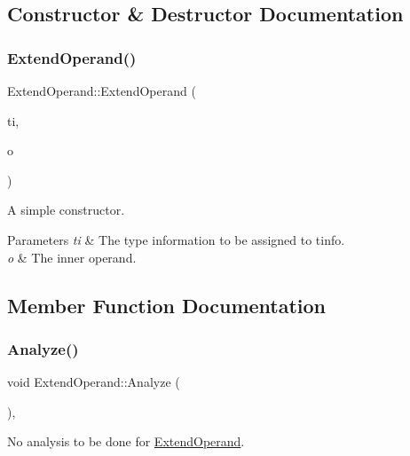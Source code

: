 \subsection{Constructor \& Destructor Documentation}
\mbox{\label{class_extend_operand_acf52217cacec2d8ff3ad0f1e659bc41d}} 
\subsubsection{\texorpdfstring{Extend\+Operand()}{ExtendOperand()}}
{\footnotesize\ttfamily Extend\+Operand\+::\+Extend\+Operand (\begin{DoxyParamCaption}\item[{\hyperlink{class_type_info}{Type\+Info} $\ast$}]{ti,  }\item[{\hyperlink{class_operand}{Operand} $\ast$}]{o }\end{DoxyParamCaption})}

A simple constructor. 
\begin{DoxyParams}{Parameters}
{\em ti} & The type information to be assigned to tinfo. \\
\hline
{\em o} & The inner operand. \\
\hline
\end{DoxyParams}


\subsection{Member Function Documentation}
\mbox{\label{class_extend_operand_ad8496c498f62dd060ea265eff6ec72da}} 
\subsubsection{\texorpdfstring{Analyze()}{Analyze()}}
{\footnotesize\ttfamily void Extend\+Operand\+::\+Analyze (\begin{DoxyParamCaption}{ }\end{DoxyParamCaption})\hspace{0.3cm}{\ttfamily [inline]}, {\ttfamily [virtual]}}

No analysis to be done for \hyperlink{class_extend_operand}{Extend\+Operand}. 

